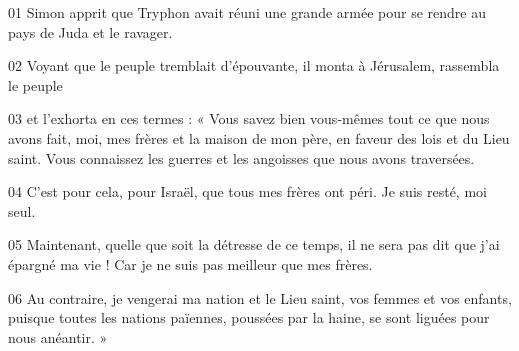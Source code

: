 01 Simon apprit que Tryphon avait réuni une grande armée pour se rendre au pays de Juda et le ravager.

02 Voyant que le peuple tremblait d’épouvante, il monta à Jérusalem, rassembla le peuple

03 et l’exhorta en ces termes : « Vous savez bien vous-mêmes tout ce que nous avons fait, moi, mes frères et la maison de mon père, en faveur des lois et du Lieu saint. Vous connaissez les guerres et les angoisses que nous avons traversées.

04 C’est pour cela, pour Israël, que tous mes frères ont péri. Je suis resté, moi seul.

05 Maintenant, quelle que soit la détresse de ce temps, il ne sera pas dit que j’ai épargné ma vie ! Car je ne suis pas meilleur que mes frères.

06 Au contraire, je vengerai ma nation et le Lieu saint, vos femmes et vos enfants, puisque toutes les nations païennes, poussées par la haine, se sont liguées pour nous anéantir. »
